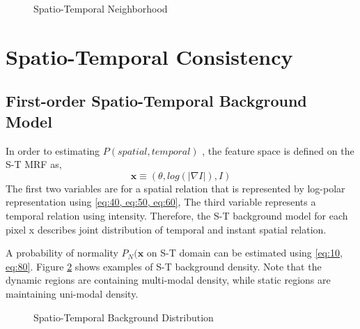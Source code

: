 \documentclass[conference]{IEEEtran}
\begin{document}
\begin{figure}[!t]
  \centering
  \label{fig:50}
  \caption{Spatio-Temporal Neighborhood}
\end{figure}


\section{Spatio-Temporal Consistency}

\subsection{First-order Spatio-Temporal Background Model}
In order to estimating \begin{math} P(spatial, temporal) \end{math} , the feature space is defined on the S-T MRF as,
\begin{equation}\label{eq:80}
  \mathbf{x} \equiv (\theta, log(|\nabla I|), I)
\end{equation}
The first two variables are for a spatial relation that is represented by log-polar representation using \ref{eq:40, eq:50, eq:60}, The third variable represents a temporal relation using intensity. Therefore, the S-T background model for each pixel x describes joint distribution of temporal and instant spatial relation. 

A probability of normality \begin{math} P_N(\mathbf{x} \end{math}  on S-T domain can be estimated using \ref{eq:10, eq:80}. Figure \ref{fig:60} shows examples of S-T background density. Note that the dynamic regions are containing multi-modal density, while static regions are maintaining uni-modal density.

\begin{figure}[!t]
  \centering
  \label{fig:60}
  \caption{Spatio-Temporal Background Distribution}
\end{figure}
\end{document}
